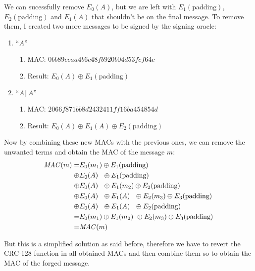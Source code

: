 \documentclass{article}
\begin{document}
We can sucessfully remove $E_0(A)$, but we are left with $E_1(\text{padding})$, $E_2(\text{padding})$ and $E_1(A)$ that shouldn't be on the final message.
To remove them, I created two more messages to be signed by the signing oracle:
\begin{enumerate}
    \item{ ``$A$''
        \begin{enumerate}
            \item MAC: $0bb89ccaa4b6c48fb920b04d53fcf64c$
            \item Result: $E_0(A) \oplus E_1(\text{padding})$
        \end{enumerate}
    }
    \item{ ``$A||A$''
        \begin{enumerate}
            \item MAC: $2066f871bb8d2432411ff16ba454854d$
            \item Result: $E_0(A) \oplus E_1(A) \oplus E_2(\text{padding})$
        \end{enumerate}
    }
\end{enumerate}

Now by combining these new MACs with the previous ones, we can remove the unwanted terms and obtain the MAC of the message $m$:
\begin{equation}
    \begin{aligned}
        \text{\textit{MAC}}(m) = &E_0(m_1) \oplus E_1(\text{padding}) \\
            \oplus &E_0(A)\ \  \oplus E_1(\text{padding}) \\
            \oplus &E_0(A)\ \  \oplus E_1(m_2)        \oplus E_2(\text{padding}) \\
            \oplus &E_0(A)\ \  \oplus E_1(A) \ \            \oplus E_2(m_3)           \oplus E_3(\text{padding}) \\
            \oplus &E_0(A)\ \ \oplus E_1(A)\ \ \oplus E_2(\text{padding}) \\
            =& E_0(m_1) \oplus E_1(m_2)\ \oplus E_2(m_3) \oplus E_3(\text{padding}) \\
            =& \text{\textit{MAC}}(m)
    \end{aligned}
\end{equation}

But this is a simplified solution as said before, therefore we have to revert the CRC-128 function in all obtained MACs and then combine them so to obtain the MAC of the forged message.
\end{document}
